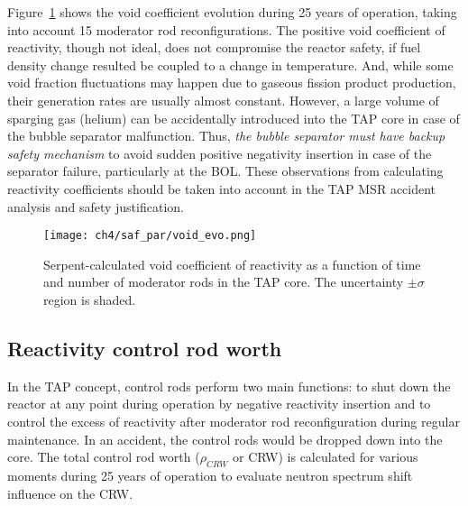 Figure~\ref{fig:void-evo} shows the void coefficient evolution during 25 years 
of operation, taking into account 15 moderator rod reconfigurations. The 
positive void coefficient of reactivity, though not ideal, does not compromise 
the reactor safety, if fuel density change resulted be coupled to a 
change in temperature. And, while some void fraction fluctuations may happen 
due to gaseous fission product production, their generation rates are 
usually almost 
constant. However, a large volume of sparging gas (helium) can be accidentally 
introduced into the \gls{TAP} core in case of the bubble separator 
malfunction. Thus, \emph{the bubble separator must have backup safety 
mechanism} to avoid 
sudden positive negativity insertion in case of the separator failure, 
particularly at the \gls{BOL}. These 
observations from calculating reactivity coefficients should be taken into 
account in the \gls{TAP} \gls{MSR} accident analysis and safety justification.
\begin{figure}[htp!] %
	\centering
	\texttt{[image: ch4/saf\_par/void\_evo.png]}
	\caption{Serpent-calculated void coefficient of reactivity as a function 
	of time and number of moderator rods in the \gls{TAP} core. The 
	uncertainty $\pm\sigma$ region is shaded.}
	\label{fig:void-evo}
\end{figure}


\subsection{Reactivity control rod worth}
In the \gls{TAP} concept, control rods perform two main functions: to shut 
down the reactor at any point during operation by negative reactivity 
insertion and to control the excess of reactivity after moderator 
rod reconfiguration during regular maintenance. In an accident, the control 
rods would be dropped down into the core. The total control rod worth 
($\rho_{CRW}$ or CRW) is calculated for various moments during 25 years of 
operation to evaluate neutron spectrum shift influence on the CRW. 

